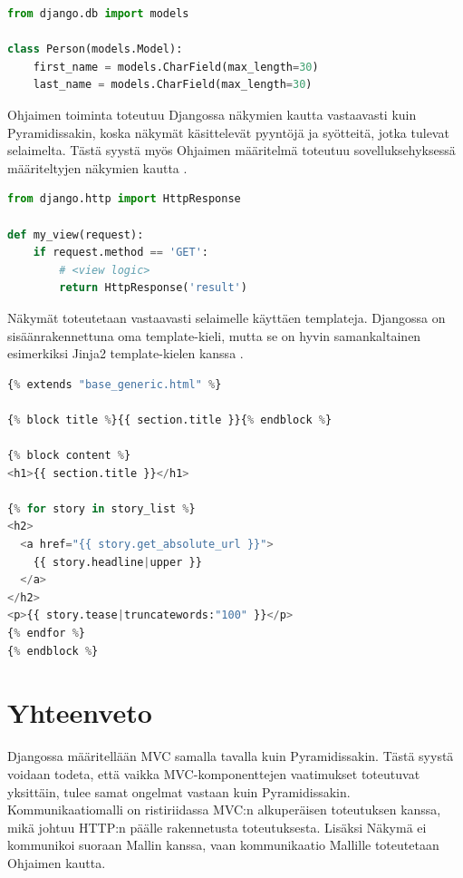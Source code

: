 \documentclass[utf8]{gradu3}
\begin{document}
\begin{lstlisting}[language=Python]
from django.db import models

class Person(models.Model):
    first_name = models.CharField(max_length=30)
    last_name = models.CharField(max_length=30)
\end{lstlisting}

Ohjaimen toiminta toteutuu Djangossa näkymien kautta vastaavasti kuin Pyramidissakin, koska näkymät käsittelevät pyyntöjä ja syötteitä, jotka tulevat selaimelta. Tästä syystä myös Ohjaimen määritelmä toteutuu  sovelluksehyksessä määriteltyjen näkymien kautta \parencite{django_view}.

\begin{lstlisting}[language=Python]
from django.http import HttpResponse

def my_view(request):
    if request.method == 'GET':
        # <view logic>
        return HttpResponse('result')
\end{lstlisting}

Näkymät toteutetaan vastaavasti selaimelle käyttäen templateja. Djangossa on sisäänrakennettuna oma template-kieli, mutta se on hyvin samankaltainen esimerkiksi Jinja2 template-kielen kanssa \parencite{django_template}.

\begin{lstlisting}[language=Python]
{% extends "base_generic.html" %}

{% block title %}{{ section.title }}{% endblock %}

{% block content %}
<h1>{{ section.title }}</h1>

{% for story in story_list %}
<h2>
  <a href="{{ story.get_absolute_url }}">
    {{ story.headline|upper }}
  </a>
</h2>
<p>{{ story.tease|truncatewords:"100" }}</p>
{% endfor %}
{% endblock %}
\end{lstlisting}

\section{Yhteenveto}
Djangossa määritellään MVC samalla tavalla kuin Pyramidissakin. Tästä syystä voidaan todeta, että vaikka MVC-komponenttejen vaatimukset toteutuvat yksittäin, tulee samat ongelmat vastaan kuin Pyramidissakin. Kommunikaatiomalli on ristiriidassa MVC:n alkuperäisen toteutuksen kanssa, mikä johtuu HTTP:n päälle rakennetusta toteutuksesta. Lisäksi Näkymä ei kommunikoi suoraan Mallin kanssa, vaan kommunikaatio Mallille toteutetaan Ohjaimen kautta. 
\end{document}
